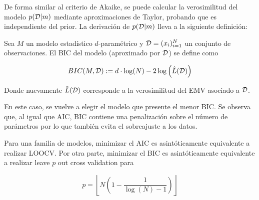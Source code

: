 De forma similar al criterio de Akaike, se puede calcular la verosimilitud del modelo $p({\mathcal D}|m)$ mediante aproximaciones de Taylor, probando que es independiente del prior. La derivación de $p({\mathcal D}|m)$ lleva a la siguiente definición:

\begin{definition}[BIC]
	Sea $M$ un modelo estadístico $d$-paramétrico y ${\mathcal D}=(x_i)_{i=1}^N$ un conjunto de observaciones. El BIC del modelo (aproximado por ${\mathcal D}$) se define como
	
	\begin{equation}
		BIC(M,{\mathcal D}):= d\cdot\log(N) - 2\log\left(\hat{L}({\mathcal D})\right)
	\end{equation}
	
	Donde nuevamente $\hat{L}({\mathcal D})$ corresponde a la verosimilitud del EMV asociado a ${\mathcal D}$.
\end{definition}

En este caso, se vuelve a elegir el modelo que presente el menor BIC. Se observa que, al igual que AIC, BIC contiene una penalización sobre el número de parámetros por lo que también evita el sobreajuste a los datos.

\begin{remark} Para una familia de modelos, minimizar el AIC es asintóticamente equivalente a realizar LOOCV. Por otra parte, minimizar el BIC es asintóticamente equivalente a realizar leave $p$ out cross validation para

\begin{equation}
	p=\left\lfloor N\left(1-\frac{1}{\log(N)-1}\right)\right\rfloor
\end{equation}
	
\end{remark}

\newpage


